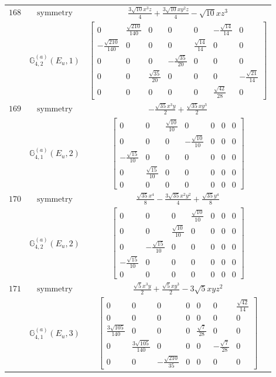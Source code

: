\documentclass[fleqn,8pt,landscape]{jsarticle}
\begin{document}
\begin{longtable}{ccc}
$ 168 $ & $ \text{symmetry} $ & $ \frac{3 \sqrt{10} x^{3} z}{4} + \frac{3 \sqrt{10} x y^{2} z}{4} - \sqrt{10} x z^{3} $ \\
$  $ & $ \mathbb{G}_{4,2}^{(a)}(E_{u},1) $ & $ \begin{bmatrix} 0 & \frac{\sqrt{210}}{140} & 0 & 0 & 0 & - \frac{\sqrt{14}}{14} & 0 \\ - \frac{\sqrt{210}}{140} & 0 & 0 & 0 & \frac{\sqrt{14}}{14} & 0 & 0 \\ 0 & 0 & 0 & - \frac{\sqrt{35}}{20} & 0 & 0 & 0 \\ 0 & 0 & \frac{\sqrt{35}}{20} & 0 & 0 & 0 & - \frac{\sqrt{21}}{14} \\ 0 & 0 & 0 & 0 & 0 & \frac{\sqrt{42}}{28} & 0 \end{bmatrix} $ \\ \hline
$ 169 $ & $ \text{symmetry} $ & $ - \frac{\sqrt{35} x^{3} y}{2} + \frac{\sqrt{35} x y^{3}}{2} $ \\
$  $ & $ \mathbb{G}_{4,1}^{(a)}(E_{u},2) $ & $ \begin{bmatrix} 0 & 0 & \frac{\sqrt{10}}{10} & 0 & 0 & 0 & 0 \\ 0 & 0 & 0 & - \frac{\sqrt{10}}{10} & 0 & 0 & 0 \\ - \frac{\sqrt{15}}{10} & 0 & 0 & 0 & 0 & 0 & 0 \\ 0 & \frac{\sqrt{15}}{10} & 0 & 0 & 0 & 0 & 0 \\ 0 & 0 & 0 & 0 & 0 & 0 & 0 \end{bmatrix} $ \\ \hline
$ 170 $ & $ \text{symmetry} $ & $ \frac{\sqrt{35} x^{4}}{8} - \frac{3 \sqrt{35} x^{2} y^{2}}{4} + \frac{\sqrt{35} y^{4}}{8} $ \\
$  $ & $ \mathbb{G}_{4,2}^{(a)}(E_{u},2) $ & $ \begin{bmatrix} 0 & 0 & 0 & \frac{\sqrt{10}}{10} & 0 & 0 & 0 \\ 0 & 0 & \frac{\sqrt{10}}{10} & 0 & 0 & 0 & 0 \\ 0 & - \frac{\sqrt{15}}{10} & 0 & 0 & 0 & 0 & 0 \\ - \frac{\sqrt{15}}{10} & 0 & 0 & 0 & 0 & 0 & 0 \\ 0 & 0 & 0 & 0 & 0 & 0 & 0 \end{bmatrix} $ \\ \hline
$ 171 $ & $ \text{symmetry} $ & $ \frac{\sqrt{5} x^{3} y}{2} + \frac{\sqrt{5} x y^{3}}{2} - 3 \sqrt{5} x y z^{2} $ \\
$  $ & $ \mathbb{G}_{4,1}^{(a)}(E_{u},3) $ & $ \begin{bmatrix} 0 & 0 & 0 & 0 & 0 & 0 & \frac{\sqrt{42}}{14} \\ 0 & 0 & 0 & 0 & 0 & 0 & 0 \\ \frac{3 \sqrt{105}}{140} & 0 & 0 & 0 & \frac{\sqrt{7}}{28} & 0 & 0 \\ 0 & \frac{3 \sqrt{105}}{140} & 0 & 0 & 0 & - \frac{\sqrt{7}}{28} & 0 \\ 0 & 0 & - \frac{\sqrt{210}}{35} & 0 & 0 & 0 & 0 \end{bmatrix} $ \\ \hline

\end{longtable}
\end{document}
